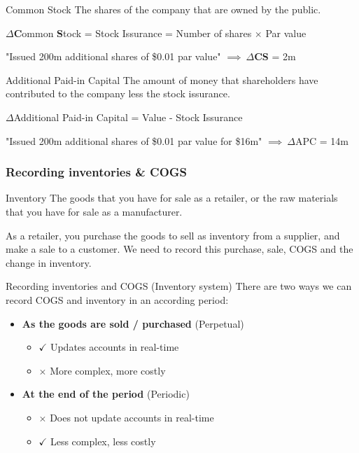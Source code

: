 \begin{knBox}
    {Common Stock}
    The shares of the company that are owned by the public.
    \begin{center}
        $\Delta$\textbf{C}ommon \textbf{S}tock = Stock Issurance = Number of shares $\times$ Par value
    \end{center}
    \tcblower
    "Issued 200m additional shares of \$0.01 par value" $\implies\ \Delta$\textbf{CS} = 2m
    \label{def:cs}
\end{knBox}

\begin{knBox}
    {Additional Paid-in Capital}
    The amount of money that shareholders have contributed to the company less the stock issurance.
    \begin{center}
        $\Delta$Additional Paid-in Capital = Value - Stock Issurance
    \end{center}
    \tcblower
    "Issued 200m additional shares of \$0.01 par value for \$16m" $\implies\ \Delta$APC = 14m
    \label{def:apic}
\end{knBox}

\subsubsection{Recording inventories \& COGS}

\begin{definition}
    {Inventory}
    The goods that you have for sale as a retailer, or the raw materials that you have for sale as a manufacturer.
\end{definition}

As a retailer, you purchase the goods to sell as inventory from a supplier, and make a sale to a customer. We need to record this purchase, sale, COGS and the change in inventory.

\begin{theorem}
    {Recording inventories and COGS (Inventory system)}
    There are two ways we can record COGS and inventory in an according period:
    \begin{itemize}
        \item \textbf{As the goods are sold / purchased} (Perpetual)
              \begin{itemize}
                  \item[] $\checkmark$ Updates accounts in real-time
                  \item[] $\times$ More complex, more costly
              \end{itemize}
        \item \textbf{At the end of the period} (Periodic)
              \begin{itemize}
                  \item[] $\times$ Does not update accounts in real-time
                  \item[] $\checkmark$ Less complex, less costly
              \end{itemize}
    \end{itemize}
\end{theorem}


